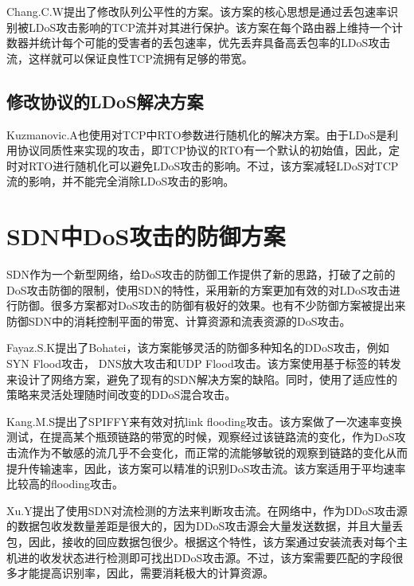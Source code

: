 Chang.C.W\cite{b8}提出了修改队列公平性的方案。该方案的核心思想是通过丢包速率识别被LDoS攻击影响的TCP流并对其进行保护。该方案在每个路由器上维持一个计数器并统计每个可能的受害者的丢包速率，优先丢弃具备高丢包率的LDoS攻击流，这样就可以保证良性TCP流拥有足够的带宽。


\subsection{修改协议的LDoS解决方案}
\label{chap2:promodify}
Kuzmanovic.A\cite{Kuzmanovic2006Low}也使用对TCP中RTO参数进行随机化的解决方案。由于LDoS是利用协议同质性来实现的攻击，即TCP协议的RTO有一个默认的初始值，因此，定时对RTO进行随机化可以避免LDoS攻击的影响。不过，该方案减轻LDoS对TCP流的影响，并不能完全消除LDoS攻击的影响。




\section{SDN中DoS攻击的防御方案}
SDN作为一个新型网络，给DoS攻击的防御工作提供了新的思路，打破了之前的DoS攻击防御的限制，使用SDN的特性，采用新的方案更加有效的对LDoS攻击进行防御。很多方案\cite{b9, b16, b10}都对DoS攻击的防御有极好的效果。也有不少防御方案\cite{b10, b12, b13, b15, b18,wang2015floodguard,zhang2017ftguard}被提出来防御SDN中的消耗控制平面的带宽、计算资源和流表资源的DoS攻击\cite{shin2013avant,cao2017disrupting}。


Fayaz.S.K\cite{b9}提出了Bohatei，该方案能够灵活的防御多种知名的DDoS攻击，例如SYN Flood攻击， DNS放大攻击和UDP Flood攻击。该方案使用基于标签的转发来设计了网络方案，避免了现有的SDN解决方案的缺陷。同时，使用了适应性的策略来灵活处理随时间改变的DDoS混合攻击。

Kang.M.S\cite{b16}提出了SPIFFY来有效对抗link flooding攻击。该方案做了一次速率变换测试，在提高某个瓶颈链路的带宽的时候，观察经过该链路流的变化，作为DoS攻击流作为不敏感的流几乎不会变化，而正常的流能够敏锐的观察到链路的变化从而提升传输速率，因此，该方案可以精准的识别DoS攻击流。该方案适用于平均速率比较高的flooding攻击。

Xu.Y\cite{b10}提出了使用SDN对流检测的方法来判断攻击流。在网络中，作为DDoS攻击源的数据包收发数量差距是很大的，因为DDoS攻击源会大量发送数据，并且大量丢包，因此，接收的回应数据包很少。根据这个特性，该方案通过安装流表对每个主机进的收发状态进行检测即可找出DDoS攻击源。不过，该方案需要匹配的字段很多才能提高识别率，因此，需要消耗极大的计算资源。


